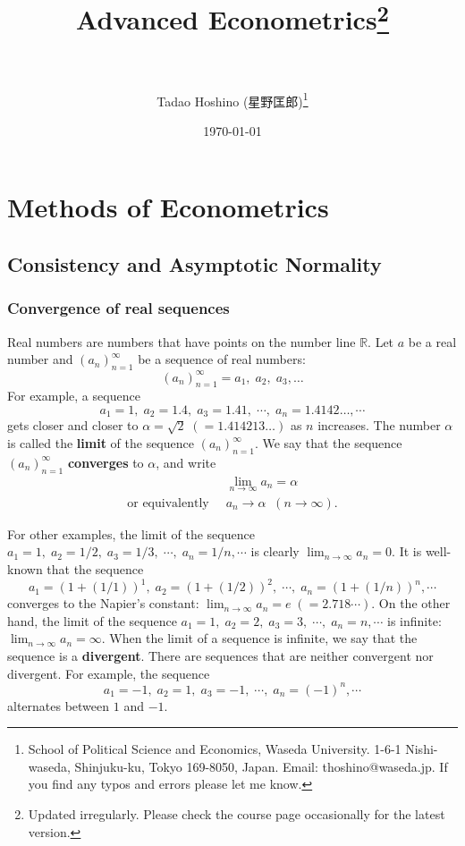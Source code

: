 \documentclass[10.5pt, A4paper, openany, uplatex]{book}
\title{
	\textbf{Advanced Econometrics}\footnote{Updated irregularly. Please check the course page occasionally for the latest version.} \\
	\Large \flushleft{Part I.\hspace{5pt}  Methods of Econometrics} \\
	\Large \flushleft{Part II. Econometric Analysis of Cross-Sectional Dependence Models}	
}
\author{Tadao Hoshino (星野匡郎)\thanks{
		School of Political Science and Economics, Waseda University. 1-6-1 Nishi-waseda, Shinjuku-ku, Tokyo 169-8050, Japan. Email: thoshino@waseda.jp. 
		If you find any typos and errors please let me know.}}
\date{\today}
\numberwithin{equation}{section}
\begin{document}
\frontmatter
\maketitle
\tableofcontents
\mainmatter 

\part{Methods of Econometrics}

\chapter{Consistency and Asymptotic Normality}\label{chap:LLN_CLT}
\section{Convergence of real sequences}
Real numbers are numbers that have points on the number line $\mathbb{R}$.
Let $a$ be a real number and $(a_n)_{n=1}^\infty$ be a sequence of real numbers:
\[
	(a_n)_{n=1}^\infty = a_1, \; a_2, \; a_3, \ldots
\]
For example, a sequence
\[
	a_1 = 1, \; a_2 = 1.4, \; a_3 = 1.41, \; \cdots, \; a_n = 1.4142\ldots, \cdots
\]
gets closer and closer to $\alpha = \sqrt{2} \; (= 1.414213\ldots)$ as $n$ increases.
The number $\alpha$ is called the \textbf{limit} of the sequence $(a_n)_{n=1}^\infty$. 
We say that the sequence $(a_n)_{n=1}^\infty$ \textbf{converges} to $\alpha$, and write
\begin{align*}
	& \lim_{n\to\infty}a_n = \alpha \\
	\text{or equivalently} \;\; & a_n \to \alpha \;\; (n\to\infty).
\end{align*}

For other examples, the limit of the sequence $a_1 = 1, \; a_2 = 1/2, \; a_3 = 1/3, \; \cdots, \; a_n = 1/n, \cdots$ is clearly $\lim_{n\to\infty}a_n = 0$.
It is well-known that the sequence
\[
	a_1 = (1 + (1/1))^1, \; a_2 = (1 + (1/2))^2, \; \cdots, \; a_n = (1 + (1/n))^n, \cdots
\]
converges to the Napier's constant: $\lim_{n\to\infty}a_n = e \; (=2.718 \cdots)$.
On the other hand, the limit of the sequence $a_1 = 1, \; a_2 = 2, \; a_3 = 3, \;\cdots, \; a_n = n, \cdots$ is infinite: $\lim_{n\to\infty}a_n = \infty$.
When the limit of a sequence is infinite, we say that the sequence is a \textbf{divergent}.
There are sequences that are neither convergent nor divergent.
For example, the sequence
\[
	a_1 = -1, \; a_2 = 1, \; a_3 = -1, \; \cdots, \; a_n = (-1)^n, \cdots
\]
alternates between $1$ and $-1$.
\end{document}
